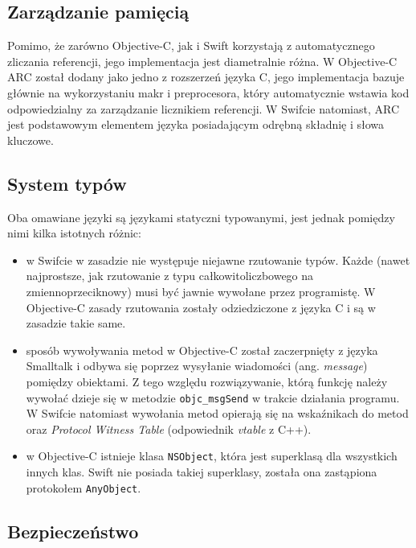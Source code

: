 \documentclass[mgr, shortabstract]{iithesis}
\newcommand{\ang}[1]{ang. \textit{#1}}
\begin{document}
\subsection{Zarządzanie pamięcią}

Pomimo, że zarówno Objective-C, jak i Swift korzystają z automatycznego zliczania referencji, jego implementacja jest diametralnie różna. W Objective-C ARC został dodany jako jedno z rozszerzeń języka C, jego implementacja bazuje głównie na wykorzystaniu makr i preprocesora, który automatycznie wstawia kod odpowiedzialny za zarządzanie licznikiem referencji. W Swifcie natomiast, ARC jest podstawowym elementem języka posiadającym odrębną składnię i słowa kluczowe.

\subsection{System typów}

Oba omawiane języki są językami statyczni typowanymi, jest jednak pomiędzy nimi kilka istotnych różnic:

\begin{itemize}

    \item w Swifcie w zasadzie nie występuje niejawne rzutowanie typów. Każde (nawet najprostsze, jak rzutowanie z typu całkowitoliczbowego na zmiennoprzeciknowy) musi być jawnie wywołane przez programistę. W Objective-C zasady rzutowania zostały odziedziczone z języka C i są w zasadzie takie same.
    \item sposób wywoływania metod w Objective-C został zaczerpnięty z języka Smalltalk i odbywa się poprzez wysyłanie wiadomości (\ang{message}) pomiędzy obiektami. Z tego względu rozwiązywanie, którą funkcję należy wywołać dzieje się w metodzie \texttt{objc_msgSend} w trakcie działania programu. W Swifcie natomiast wywołania metod opierają się na wskaźnikach do metod oraz \textit{Protocol Witness Table} (odpowiednik \textit{vtable} z C++).
    \item w Objective-C istnieje klasa \texttt{NSObject}, która jest superklasą dla wszystkich innych klas. Swift nie posiada takiej superklasy, została ona zastąpiona protokołem \texttt{AnyObject}.

\end{itemize}

\subsection{Bezpieczeństwo}
\end{document}
